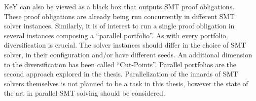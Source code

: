 \documentclass{scrartcl}
\begin{document}
KeY can also be viewed as a black box that outputs SMT proof obligations.
These proof obligations are already being run concurrently in different SMT solver instances.
Similarly, it is of interest to run a single proof obligation in several instances
composing a \enquote{parallel portfolio}.
As with every portfolio, diversification is crucial.
The solver instances should differ in the choice of SMT solver,
in their configuration and/or have different seeds.
An additional dimension to the diversification has been called \enquote{Cut-Points}.
Parallel portfolios are the second approach explored in the thesis.
Parallelization of the innards of SMT solvers themselves is not planned to be a task in this thesis,
however the state of the art in parallel SMT solving should be considered.
\end{document}
